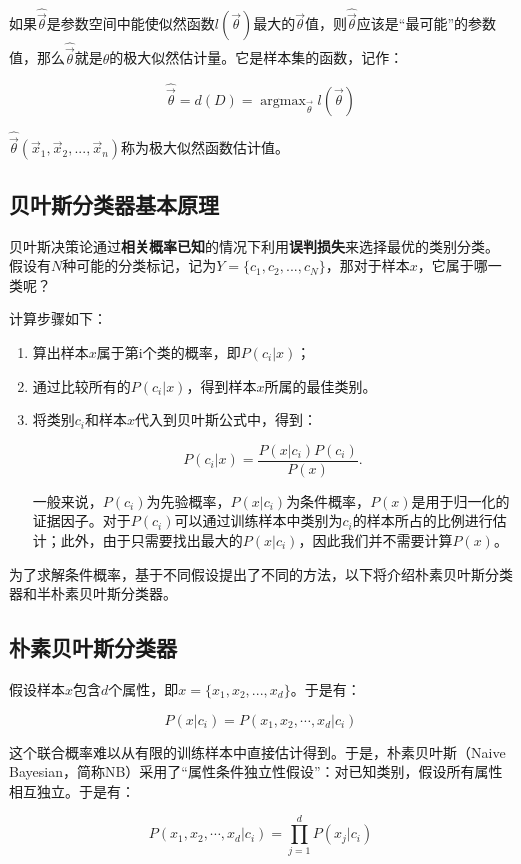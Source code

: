 如果$\hat{\vec\theta}$是参数空间中能使似然函数$l(\vec\theta)$最大的$\vec\theta$值，则$\hat{\vec\theta}$应该是“最可能”的参数值，那么$\hat{\vec\theta}$就是$\theta$的极大似然估计量。它是样本集的函数，记作：

$$
\hat{\vec\theta}=d(D)= \mathop {\arg \max}_{\vec\theta} l(\vec\theta )
$$

$\hat{\vec\theta}(\vec x_{1},\vec x_{2},...,\vec x_{n})$称为极大似然函数估计值。

\subsection{贝叶斯分类器基本原理}

贝叶斯决策论通过{\bf 相关概率已知}的情况下利用{\bf 误判损失}来选择最优的类别分类。 假设有$N$种可能的分类标记，记为$Y=\{c_1,c_2,...,c_N\}$，那对于样本${x}$，它属于哪一类呢？

计算步骤如下：

\begin{enumerate}\itemsep0em 
		\item 算出样本${x}$属于第i个类的概率，即$P(c_i|x)$；
		\item 通过比较所有的$P(c_i|{x})$，得到样本${x}$所属的最佳类别。
		\item 将类别$c_i$和样本${x}$代入到贝叶斯公式中，得到：

		$$
		P(c_i|{x})=\frac{P({x}|c_i)P(c_i)}{P({x})}.
		$$

		一般来说，$P(c_i)$为先验概率，$P({x}|c_i)$为条件概率，$P({x})$是用于归一化的证据因子。对于$P(c_i)$可以通过训练样本中类别为$c_i$的样本所占的比例进行估计；此外，由于只需要找出最大的$P({x}|c_i)$，因此我们并不需要计算$P({x})$。  
\end{enumerate}

为了求解条件概率，基于不同假设提出了不同的方法，以下将介绍朴素贝叶斯分类器和半朴素贝叶斯分类器。

\subsection{朴素贝叶斯分类器}


假设样本${x}$包含$d$个属性，即${x}=\{ x_1,x_2,...,x_d\}$。于是有：

$$
P({x}|c_i)=P(x_1,x_2,\cdots,x_d|c_i)
$$

这个联合概率难以从有限的训练样本中直接估计得到。于是，朴素贝叶斯（Naive Bayesian，简称NB）采用了``属性条件独立性假设''：对已知类别，假设所有属性相互独立。于是有：

$$
P(x_1,x_2,\cdots,x_d|c_i)=\prod_{j=1}^d P(x_j|c_i)
$$

